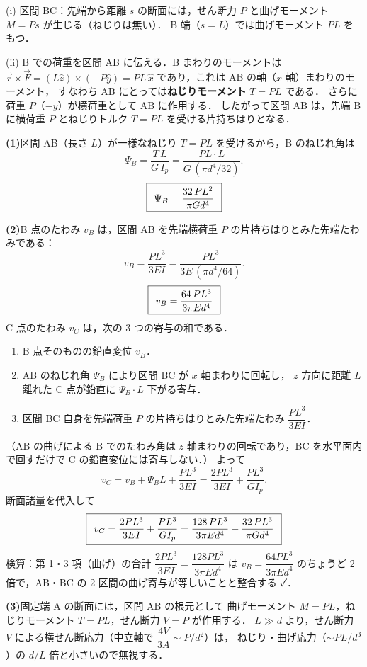 \documentclass[11pt,a4paper]{article}
\begin{document}
\noindent(i) 区間 BC：先端から距離 $s$ の断面には，せん断力 $P$ と曲げモーメント $M=Ps$ が生じる（ねじりは無い）．
B 端（$s=L$）では曲げモーメント $PL$ をもつ．

\noindent(ii) B での荷重を区間 AB に伝える．B まわりのモーメントは
$\vec r\times\vec F=(L\hat z)\times(-P\hat y)=PL\,\hat x$ であり，これは AB の軸（$x$ 軸）まわりのモーメント，
すなわち AB にとっては\textbf{ねじりモーメント} $T=PL$ である．
さらに荷重 $P$（$-y$）が横荷重として AB に作用する．
したがって区間 AB は，先端 B に横荷重 $P$ とねじりトルク $T=PL$ を受ける片持ちはりとなる．

\medskip
\noindent\textbf{(1)}\quad 区間 AB（長さ $L$）が一様なねじり $T=PL$ を受けるから，B のねじれ角は
\[
  \Psi_B=\frac{T\,L}{G\,I_p}=\frac{PL\cdot L}{G\,(\pi d^4/32)}.
\]
\[
  \boxed{\,\;\Psi_B=\dfrac{32\,P L^2}{\pi G d^4}\;\,}
\]

\medskip
\noindent\textbf{(2)}\quad B 点のたわみ $v_B$ は，区間 AB を先端横荷重 $P$ の片持ちはりとみた先端たわみである：
\[
  v_B=\frac{P L^3}{3EI}=\frac{P L^3}{3E\,(\pi d^4/64)}.
\]
\[
  \boxed{\,\;v_B=\dfrac{64\,P L^3}{3\pi E d^4}\;\,}
\]
C 点のたわみ $v_C$ は，次の 3 つの寄与の和である．
\begin{enumerate}[label=(\alph*)]
  \item B 点そのものの鉛直変位 $v_B$．
  \item AB のねじれ角 $\Psi_B$ により区間 BC が $x$ 軸まわりに回転し，
        $z$ 方向に距離 $L$ 離れた C 点が鉛直に $\Psi_B\cdot L$ 下がる寄与．
  \item 区間 BC 自身を先端荷重 $P$ の片持ちはりとみた先端たわみ $\dfrac{P L^3}{3EI}$．
\end{enumerate}
（AB の曲げによる B でのたわみ角は $z$ 軸まわりの回転であり，BC を水平面内で回すだけで C の鉛直変位には寄与しない．）
よって
\[
  v_C=v_B+\Psi_B L+\frac{P L^3}{3EI}
     =\frac{2P L^3}{3EI}+\frac{P L^3}{G I_p}.
\]
断面諸量を代入して
\[
  \boxed{\,\;v_C=\dfrac{2P L^3}{3EI}+\dfrac{P L^3}{G I_p}
        =\dfrac{128\,P L^3}{3\pi E d^4}+\dfrac{32\,P L^3}{\pi G d^4}\;\,}
\]
検算：第 1・3 項（曲げ）の合計 $\dfrac{2PL^3}{3EI}=\dfrac{128PL^3}{3\pi Ed^4}$ は
$v_B=\dfrac{64PL^3}{3\pi Ed^4}$ のちょうど 2 倍で，AB・BC の 2 区間の曲げ寄与が等しいことと整合する ✓．

\medskip
\noindent\textbf{(3)}\quad 固定端 A の断面には，区間 AB の根元として
曲げモーメント $M=PL$，ねじりモーメント $T=PL$，せん断力 $V=P$ が作用する．
$L\gg d$ より，せん断力 $V$ による横せん断応力（中立軸で $\dfrac{4V}{3A}\sim P/d^2$）は，
ねじり・曲げ応力（$\sim PL/d^3$）の $d/L$ 倍と小さいので無視する．
\end{document}
